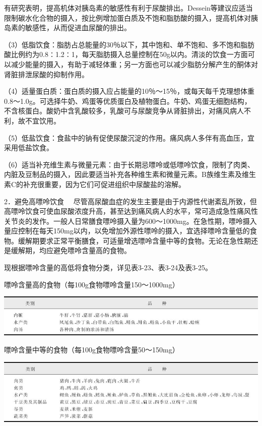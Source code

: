 有研究表明，提高机体对胰岛素的敏感性有利于尿酸排出。Dessein等建议应适当限制碳水化合物的摄入，按比例增加蛋白质及不饱和脂肪酸的摄入，提高机体对胰岛素的敏感性，从而促进血尿酸的排出。

（3）低脂饮食：脂肪占总能量的30％以下，其中饱和、单不饱和、多不饱和脂肪酸比例约为0.8∶1.2∶1，每天脂肪摄入总量控制在50g以内。清淡的饮食一方面可以减少能量的摄入，有助于减轻体重；另一方面也可以减少脂肪分解产生的酮体对肾脏排泄尿酸的抑制作用。

（4）适量蛋白质：蛋白质的摄入应占能量的10％～15％，或每天每千克理想体重0.8～1.0g。可选择牛奶、鸡蛋等优质蛋白及植物蛋白。牛奶、鸡蛋无细胞结构，不含核蛋白。酸奶中含乳酸较多，乳酸可与尿酸竞争从肾脏排出，对痛风病人不利，故不宜饮用。

（5）低盐饮食：食盐中的钠有促使尿酸沉淀的作用。痛风病人多伴有高血压，宜采用低盐饮食。

（6）适当补充维生素与微量元素：由于长期忌嘌呤或低嘌呤饮食，限制了肉类、内脏及豆制品的摄入，因此要适当补充各种维生素和微量元素。B族维生素及维生素C的补充很重要，因为它们可促进组织中尿酸盐的溶解。

{2．避免高嘌呤饮食}
　尽管高尿酸血症的发生主要是由于内源性代谢紊乱所致，但高嘌呤饮食可使血尿酸浓度升高，甚至达到痛风病人的水平，常可造成急性痛风性关节炎的发作。一般人日常膳食嘌呤摄入量为600～1000mg。在急性期，嘌呤摄入量应控制在每天150mg以内，以免增加外源性嘌呤的摄入，宜选择嘌呤含量低的食物。缓解期要求正常平衡膳食，可适量增选嘌呤含量中等的食物。无论在急性期还是缓解期，均应避免嘌呤含量高的食物。

现根据嘌呤含量的高低将食物分类，详见表3-23、表3-24及表3-25。

\begin{table}[htbp]
\centering
\caption{嘌呤含量高的食物（每100g食物嘌呤含量150～1000mg）}
\label{tab3-23}
\includegraphics{./images/Image00040.jpg}
\end{table}

\begin{table}[htbp]
\centering
\caption{嘌呤含量中等的食物（每100g食物嘌呤含量50～150mg）}
\label{tab3-24}
\includegraphics{./images/Image00041.jpg}
\end{table}

